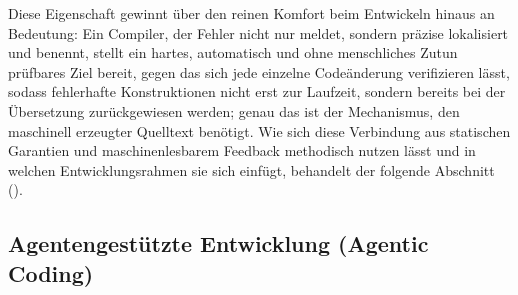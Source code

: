 Diese Eigenschaft gewinnt über den reinen Komfort beim Entwickeln hinaus an Bedeutung: Ein Compiler, der Fehler nicht
nur meldet, sondern präzise lokalisiert und benennt, stellt ein hartes, automatisch und ohne menschliches
Zutun prüfbares Ziel bereit, gegen das sich jede einzelne Codeänderung verifizieren lässt, sodass fehlerhafte
Konstruktionen nicht erst zur Laufzeit, sondern bereits bei der Übersetzung zurückgewiesen werden; genau
das ist der Mechanismus, den maschinell erzeugter Quelltext benötigt. Wie sich diese Verbindung aus statischen
Garantien und maschinenlesbarem Feedback methodisch nutzen lässt und in welchen Entwicklungsrahmen sie sich
einfügt, behandelt der folgende Abschnitt ().

\subsection{Agentengestützte Entwicklung (Agentic Coding)}
\label{subsec:agentic-coding}

